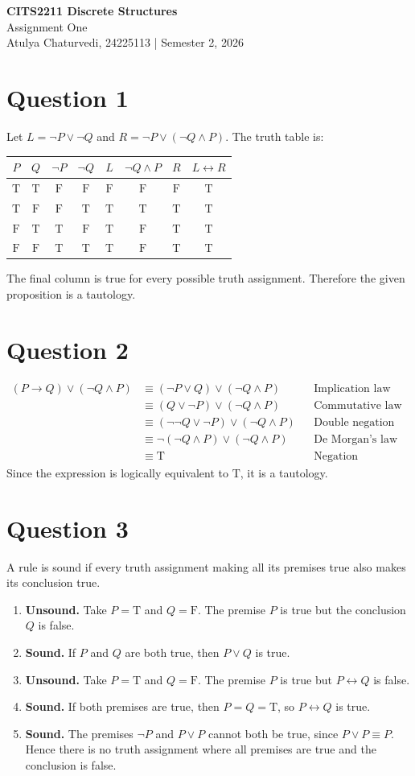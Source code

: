 \documentclass[11pt,a4paper]{article}
\newcommand{\T}{\mathrm{T}}
\newcommand{\F}{\mathrm{F}}
\newcommand{\question}[1]{\Needspace{6\baselineskip}\section*{Question #1}}
\begin{document}
\begin{center}
{\Large\bfseries CITS2211 Discrete Structures}\\[3pt]
{\large Assignment One}\\[5pt]
Atulya Chaturvedi, 24225113 \quad | \quad Semester 2, 2026
\end{center}

\question{1}
Let $L=\neg P\vee\neg Q$ and $R=\neg P\vee(\neg Q\wedge P)$.
The truth table is:
\begin{center}
\renewcommand{\arraystretch}{1.15}
\begin{tabular}{cc|cc|ccc|c}
\toprule
$P$ & $Q$ & $\neg P$ & $\neg Q$ & $L$ & $\neg Q\wedge P$ & $R$ & $L\leftrightarrow R$\\
\midrule
$\T$ & $\T$ & $\F$ & $\F$ & $\F$ & $\F$ & $\F$ & $\T$\\
$\T$ & $\F$ & $\F$ & $\T$ & $\T$ & $\T$ & $\T$ & $\T$\\
$\F$ & $\T$ & $\T$ & $\F$ & $\T$ & $\F$ & $\T$ & $\T$\\
$\F$ & $\F$ & $\T$ & $\T$ & $\T$ & $\F$ & $\T$ & $\T$\\
\bottomrule
\end{tabular}
\end{center}
The final column is true for every possible truth assignment. Therefore the given proposition is a tautology.

\question{2}
\begin{align*}
(P\to Q)\vee(\neg Q\wedge P)
&\equiv(\neg P\vee Q)\vee(\neg Q\wedge P)
&&\text{Implication law}\\
&\equiv(Q\vee\neg P)\vee(\neg Q\wedge P)
&&\text{Commutative law}\\
&\equiv(\neg\neg Q\vee\neg P)\vee(\neg Q\wedge P)
&&\text{Double negation law}\\
&\equiv\neg(\neg Q\wedge P)\vee(\neg Q\wedge P)
&&\text{De Morgan's law}\\
&\equiv\T
&&\text{Negation (complement) law}
\end{align*}
Since the expression is logically equivalent to $\T$, it is a tautology.

\question{3}
A rule is sound if every truth assignment making all its premises true also makes its conclusion true.
\begin{enumerate}[label=(\alph*)]
\item \textbf{Unsound.} Take $P=\T$ and $Q=\F$. The premise $P$ is true but the conclusion $Q$ is false.
\item \textbf{Sound.} If $P$ and $Q$ are both true, then $P\vee Q$ is true.
\item \textbf{Unsound.} Take $P=\T$ and $Q=\F$. The premise $P$ is true but $P\leftrightarrow Q$ is false.
\item \textbf{Sound.} If both premises are true, then $P=Q=\T$, so $P\leftrightarrow Q$ is true.
\item \textbf{Sound.} The premises $\neg P$ and $P\vee P$ cannot both be true, since $P\vee P\equiv P$. Hence there is no truth assignment where all premises are true and the conclusion is false.
\end{enumerate}
\end{document}
